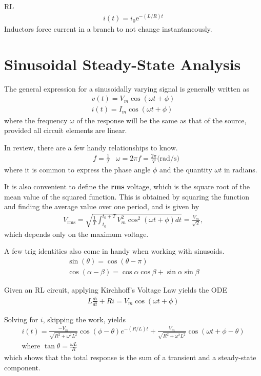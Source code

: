\documentclass[a4paper,10pt]{report}
\begin{document}
RL
\begin{align*}
i(t) = i_0\mathrm{e}^{-(L/R)t}
\end{align*}
Inductors force current in a branch to not change instantaneously.

\chapter{Sinusoidal Steady-State Analysis}
The general expression for a sinusoidally varying signal is generally written as
\begin{align*}
	v(t) = V_m \cos(\omega t + \phi) \\
	i(t) = I_m \cos(\omega t + \phi)
\end{align*}
where the frequency $\omega$ of the response will be the same as that of the source, provided all circuit elements are linear. %

In review, there are a few handy relationships to know.
\begin{align*}
	&f=\frac{1}{T} &\omega = 2\pi f = \frac{2\pi}{T} \text{(rad/s)}
\end{align*}
where it is common to express the phase angle $\phi$ and the quantity $\omega t$ in radians.

It is also convenient to define the \textbf{rms} voltage, which is the square root of the mean value of the squared function. This is obtained by squaring the function and finding the average value over one period, and is given by
\begin{align*}
	V_{\text{rms}} = \sqrt{\frac{1}{T}\int_{t_0}^{t_0 + T} V_m^2 \cos^2(\omega t + \phi)dt} = \frac{V_m}{\sqrt{2}},
\end{align*}
which depends only on the maximum voltage.

A few trig identities also come in handy when working with sinusoids.
\begin{align*}
	\sin(\theta) = \cos(\theta-\pi) \\
	\cos(\alpha-\beta) = \cos\alpha\cos\beta + \sin\alpha\sin\beta
\end{align*}

Given an RL circuit, applying Kirchhoff's Voltage Law yields the ODE
\begin{align*}
	L\frac{di}{dt} + Ri = V_m\cos(\omega t + \phi)
\end{align*}

Solving for $i$, skipping the work, yields
\begin{align*}
	i(t) = \frac{-V_m}{\sqrt{R^2 +\omega^2 L^2}}\cos(\phi - \theta)e^{-(R/L)t}
	+ \frac{V_m}{\sqrt{R^2 + \omega^2 L^2}}\cos(\omega t + \phi - \theta) \\
	\text{where } \tan\theta = \frac{\omega L}{R}
\end{align*}
which shows that the total response is the sum of a transient and a steady-state component.
\end{document}
